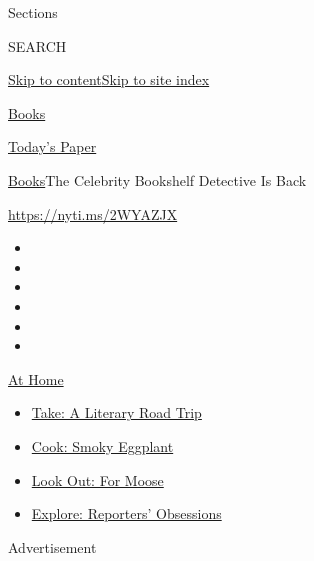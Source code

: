 Sections

SEARCH

\protect\hyperlink{site-content}{Skip to
content}\protect\hyperlink{site-index}{Skip to site index}

\href{https://www.nytimes.com/section/books}{Books}

\href{https://myaccount.nytimes.com/auth/login?response_type=cookie\&client_id=vi}{}

\href{https://www.nytimes.com/section/todayspaper}{Today's Paper}

\href{/section/books}{Books}\textbar{}The Celebrity Bookshelf Detective
Is Back

\url{https://nyti.ms/2WYAZJX}

\begin{itemize}
\item
\item
\item
\item
\item
\item
\end{itemize}

\href{https://www.nytimes.com/spotlight/at-home?action=click\&pgtype=Article\&state=default\&region=TOP_BANNER\&context=at_home_menu}{At
Home}

\begin{itemize}
\tightlist
\item
  \href{https://www.nytimes.com/2020/07/28/books/time-for-a-literary-road-trip.html?action=click\&pgtype=Article\&state=default\&region=TOP_BANNER\&context=at_home_menu}{Take:
  A Literary Road Trip}
\item
  \href{https://www.nytimes.com/2020/07/29/magazine/bored-with-your-home-cooking-some-smoky-eggplant-will-fix-that.html?action=click\&pgtype=Article\&state=default\&region=TOP_BANNER\&context=at_home_menu}{Cook:
  Smoky Eggplant}
\item
  \href{https://www.nytimes.com/2020/07/27/travel/moose-michigan-isle-royale.html?action=click\&pgtype=Article\&state=default\&region=TOP_BANNER\&context=at_home_menu}{Look
  Out: For Moose}
\item
  \href{https://www.nytimes.com/interactive/2020/at-home/even-more-reporters-editors-diaries-lists-recommendations.html?action=click\&pgtype=Article\&state=default\&region=TOP_BANNER\&context=at_home_menu}{Explore:
  Reporters' Obsessions}
\end{itemize}

Advertisement

